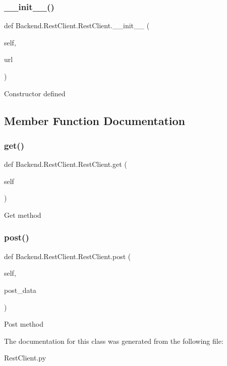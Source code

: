 \subsubsection{\texorpdfstring{\+\_\+\+\_\+init\+\_\+\+\_\+()}{\_\_init\_\_()}}
{\footnotesize\ttfamily def Backend.\+Rest\+Client.\+Rest\+Client.\+\_\+\+\_\+init\+\_\+\+\_\+ (\begin{DoxyParamCaption}\item[{}]{self,  }\item[{}]{url }\end{DoxyParamCaption})}

\begin{DoxyVerb}Constructor defined\end{DoxyVerb}
 

\subsection{Member Function Documentation}
\hypertarget{class_backend_1_1_rest_client_1_1_rest_client_adf9e226195f961c90d0d274804dd6a75}{}\label{class_backend_1_1_rest_client_1_1_rest_client_adf9e226195f961c90d0d274804dd6a75} 
\subsubsection{\texorpdfstring{get()}{get()}}
{\footnotesize\ttfamily def Backend.\+Rest\+Client.\+Rest\+Client.\+get (\begin{DoxyParamCaption}\item[{}]{self }\end{DoxyParamCaption})}

\begin{DoxyVerb}Get method\end{DoxyVerb}
 \hypertarget{class_backend_1_1_rest_client_1_1_rest_client_a2178f363f425eab9c857c0af25c24b71}{}\label{class_backend_1_1_rest_client_1_1_rest_client_a2178f363f425eab9c857c0af25c24b71} 
\subsubsection{\texorpdfstring{post()}{post()}}
{\footnotesize\ttfamily def Backend.\+Rest\+Client.\+Rest\+Client.\+post (\begin{DoxyParamCaption}\item[{}]{self,  }\item[{}]{post\+\_\+data }\end{DoxyParamCaption})}

\begin{DoxyVerb}Post method\end{DoxyVerb}
 

The documentation for this class was generated from the following file\+:\begin{DoxyCompactItemize}
\item 
Rest\+Client.\+py\end{DoxyCompactItemize}
